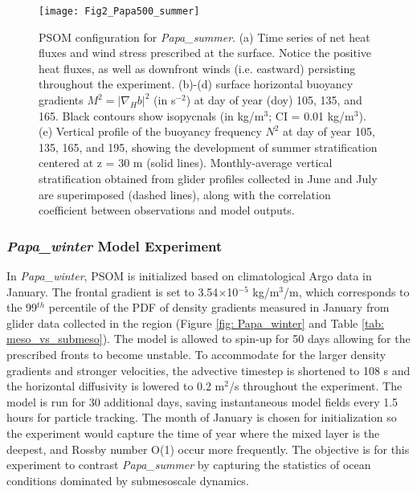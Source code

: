 \documentclass[article,linenumbers]{agujournal2018}
\begin{document}
	\begin{figure}[t]
		\texttt{[image: Fig2\_Papa500\_summer]}
		\caption{PSOM configuration for \textit{Papa\_summer}. (a) Time series of net heat fluxes and wind stress prescribed at the surface. Notice the positive heat fluxes, as well as downfront winds (i.e. eastward) persisting throughout the experiment. (b)-(d) surface horizontal buoyancy gradients $M^2 = |\nabla_Hb|^2$ (in s$^{-2}$) at day of year (doy) 105, 135, and 165. Black contours show isopycnals (in kg/m$^3$; CI = 0.01 kg/m$^3$). (e) Vertical profile of the buoyancy frequency $N^2$ at day of year 105, 135, 165, and 195, showing the development of summer stratification centered at z = 30 m (solid lines). Monthly-average vertical stratification obtained from glider profiles collected in June and July are superimposed (dashed lines), along with the correlation coefficient between observations and model outputs.}
		\label{fig: Papa_summer}
	\end{figure} 
	
	
	\subsubsection{\textit{Papa\_winter} Model Experiment}
	
	In \textit{Papa\_winter}, PSOM is initialized based on climatological Argo data in January. The frontal gradient is set to 3.54$\times$10$^{-5}$ kg/m$^3$/m, which corresponds to the 99$^{th}$ percentile of the PDF of density gradients measured in January from glider data collected in the region (Figure \ref{fig: Papa_winter} and Table \ref{tab: meso_vs_submeso}). The model is allowed to spin-up for 50 days allowing for the prescribed fronts to become unstable. To accommodate for the larger density gradients and stronger velocities, the advective timestep is shortened to 108 s and the horizontal diffusivity is lowered to 0.2 m$^2$/s throughout the experiment. The model is run for 30 additional days, saving instantaneous model fields every 1.5 hours for particle tracking. The month of January is chosen for initialization so the experiment would capture the time of year where the mixed layer is the deepest, and Rossby number O(1) occur more frequently. The objective is for this experiment to contrast \textit{Papa\_summer} by capturing the statistics of ocean conditions dominated by submesoscale dynamics.
	
\end{document}
